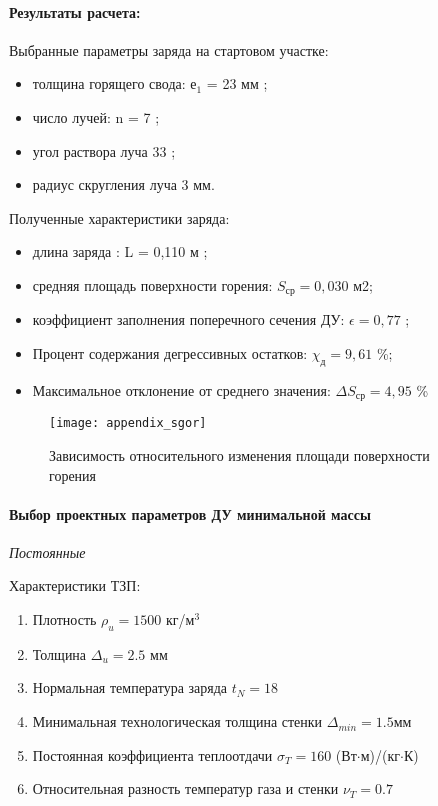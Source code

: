 \paragraph{Результаты расчета:}

Выбранные параметры заряда на стартовом участке:
\begin{itemize}
	\item толщина горящего свода:  				$е_1$ = 23 мм ;
	\item число лучей:						n = 7 ;
	\item угол раствора луча					33 \textdegree;
	\item радиус скругления луча 				3 мм.
\end{itemize}
									
\clearpage
Полученные характеристики заряда:
\begin{itemize}
	\item длина заряда :							L = 0,110 м ;
	\item средняя площадь поверхности горения:			$S_\text{ср} = 0,030 $ м2;
	\item коэффициент заполнения поперечного сечения ДУ:	$\epsilon= 0,77$ ;
	\item Процент содержания дегрессивных остатков: 		$\chi_\text{д} = 9,61$ \%;
	\item Максимальное отклонение от среднего значения:	$\Delta S_\text{ср}=4,95$ \%
\end{itemize}

\begin{figure}[!h]
\begin{center}
    \texttt{[image: appendix\_sgor]}
	\caption{Зависимость относительного изменения площади поверхности горения}
    \label{fig:appendix_sgor}
\end{center}
\end{figure}


\clearpage
\paragraph{Выбор проектных параметров ДУ минимальной массы}

\emph{Постоянные}

Характеристики ТЗП:
\begin{enumerate}
	\item Плотность 								$\rho_u=1500 $ кг/$\text{м}^3$
	\item Толщина								$\Delta _u=2.5$ мм
	\item Нормальная температура заряда				$t_N=18$ \textdegree
	\item Минимальная технологическая толщина стенки	$\Delta _{min}=1.5 $мм
	\item Постоянная коэффициента теплоотдачи			$\sigma_T=160$  (Вт$\cdot$м)/(кг$\cdot$К)
	\item Относительная разность температур газа и стенки	$\nu_T=0.7$
\end{enumerate}

